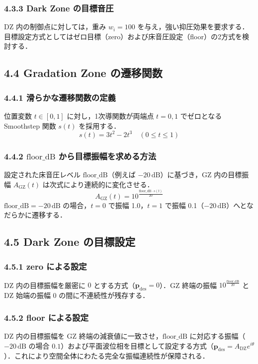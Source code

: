 \documentclass[11pt, a4paper]{article}
\begin{document}
\subsubsection{4.3.3 Dark Zone の目標音圧}
DZ 内の制御点に対しては，重み $w_i = 100$ を与え，強い抑圧効果を要求する．目標設定方式としてはゼロ目標（zero）および床音圧設定（floor）の2方式を検討する．

\subsection{4.4 Gradation Zone の遷移関数}
\subsubsection{4.4.1 滑らかな遷移関数の定義}
位置変数 $t \in [0, 1]$ に対し，1次導関数が両端点 $t=0, 1$ でゼロとなる Smoothstep 関数 $s(t)$ を採用する．
\begin{equation}
s(t) = 3t^2 - 2t^3 \quad (0 \le t \le 1)
\end{equation}

\subsubsection{4.4.2 $\mathrm{floor\_dB}$ から目標振幅を求める方法}
設定された床音圧レベル $\mathrm{floor\_dB}$（例えば $-20\,\mathrm{dB}$）に基づき，GZ 内の目標振幅 $A_{\mathrm{GZ}}(t)$ は次式により連続的に変化させる．
\begin{equation}
A_{\mathrm{GZ}}(t) = 10^{\frac{\mathrm{floor\_dB} \cdot s(t)}{20}}
\end{equation}
$\mathrm{floor\_dB} = -20\,\mathrm{dB}$ の場合，$t=0$ で振幅 1.0，$t=1$ で振幅 0.1（$-20\,\mathrm{dB}$）へとなだらかに遷移する．

\subsection{4.5 Dark Zone の目標設定}
\subsubsection{4.5.1 zero による設定}
DZ 内の目標振幅を厳密に $0$ とする方式（$\mathbf{p}_{\mathrm{des}} = 0$）．GZ 終端の振幅 $10^{\frac{\mathrm{floor\_dB}}{20}}$ と DZ 始端の振幅 $0$ の間に不連続性が残存する．

\subsubsection{4.5.2 floor による設定}
DZ 内の目標振幅を GZ 終端の減衰値に一致させ，$\mathrm{floor\_dB}$ に対応する振幅（$-20\,\mathrm{dB}$ の場合 $0.1$）および平面波位相を目標として設定する方式（$\mathbf{p}_{\mathrm{des}} = A_{\mathrm{DZ}} e^{i \theta}$）．これにより空間全体にわたる完全な振幅連続性が保障される．
\end{document}
